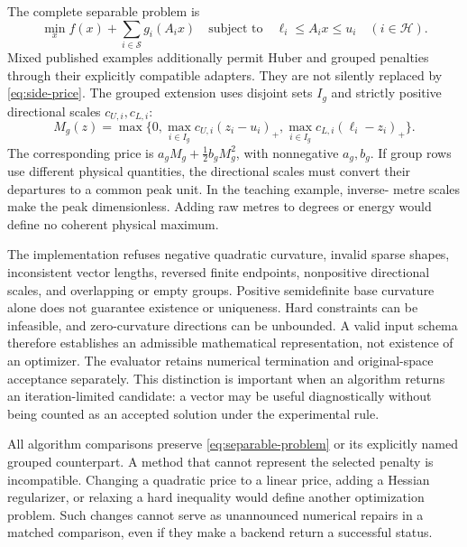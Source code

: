 The complete separable problem is
\begin{equation}\label{eq:separable-problem}
 \min_x f(x)+\sum_{i\in\mathcal S}g_i(A_i x)
 \quad\text{subject to}\quad
 \ell_i\leq A_i x\leq u_i\quad(i\in\mathcal H).
\end{equation}
Mixed published examples additionally permit Huber and grouped penalties through
their explicitly compatible adapters. They are not silently replaced by
\eqref{eq:side-price}. The grouped extension uses disjoint sets $I_g$ and
strictly positive directional scales $c_{U,i},c_{L,i}$:
\begin{equation}\label{eq:group-peak}
 M_g(z)=\max\{0,\max_{i\in I_g}c_{U,i}(z_i-u_i)_+,
                   \max_{i\in I_g}c_{L,i}(\ell_i-z_i)_+\}.
\end{equation}
The corresponding price is $a_gM_g+\tfrac12b_gM_g^2$, with nonnegative $a_g,b_g$.
If group rows use different physical quantities, the directional scales must
convert their departures to a common peak unit. In the teaching example, inverse-
metre scales make the peak dimensionless. Adding raw metres to degrees or energy
would define no coherent physical maximum.

The implementation refuses negative quadratic curvature, invalid sparse shapes,
inconsistent vector lengths, reversed finite endpoints, nonpositive directional
scales, and overlapping or empty groups. Positive semidefinite base curvature
alone does not guarantee existence or uniqueness. Hard constraints can be
infeasible, and zero-curvature directions can be unbounded. A valid input schema
therefore establishes an admissible mathematical representation, not existence
of an optimizer. The evaluator retains numerical termination and original-space
acceptance separately. This distinction is important when an algorithm returns
an iteration-limited candidate: a vector may be useful diagnostically without
being counted as an accepted solution under the experimental rule.

All algorithm comparisons preserve \eqref{eq:separable-problem} or its explicitly
named grouped counterpart. A method that cannot represent the selected penalty
is incompatible. Changing a quadratic price to a linear price, adding a Hessian
regularizer, or relaxing a hard inequality would define another optimization
problem. Such changes cannot serve as unannounced numerical repairs in a matched
comparison, even if they make a backend return a successful status.
